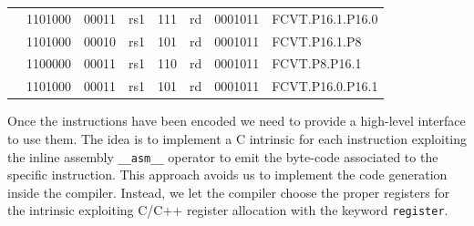 \begin{table}
\begin{small}
\begin{center}
\begin{tabular}{p{0in}p{0.4in}p{0.05in}p{0.05in}p{0.05in}p{0.05in}p{0.4in}p{0.6in}p{0.4in}p{0.6in}p{0.7in}l}
&
\multicolumn{4}{|c|}{1101000} &
\multicolumn{2}{c|}{00011} &
\multicolumn{1}{c|}{rs1} &
\multicolumn{1}{c|}{111} &
\multicolumn{1}{c|}{rd} &
\multicolumn{1}{c|}{0001011} & FCVT.P16.1.P16.0 \\
\cline{2-11}


&
\multicolumn{4}{|c|}{1101000} &
\multicolumn{2}{c|}{00010} &
\multicolumn{1}{c|}{rs1} &
\multicolumn{1}{c|}{101} &
\multicolumn{1}{c|}{rd} &
\multicolumn{1}{c|}{0001011} & FCVT.P16.1.P8 \\
\cline{2-11}


&
\multicolumn{4}{|c|}{1100000} &
\multicolumn{2}{c|}{00011} &
\multicolumn{1}{c|}{rs1} &
\multicolumn{1}{c|}{110} &
\multicolumn{1}{c|}{rd} &
\multicolumn{1}{c|}{0001011} & FCVT.P8.P16.1 \\
\cline{2-11}


&
\multicolumn{4}{|c|}{1101000} &
\multicolumn{2}{c|}{00011} &
\multicolumn{1}{c|}{rs1} &
\multicolumn{1}{c|}{101} &
\multicolumn{1}{c|}{rd} &
\multicolumn{1}{c|}{0001011} & FCVT.P16.0.P16.1 \\
\cline{2-11}


\end{tabular}
\end{center}
\end{small}
\label{tab:rvxposit}
\end{table}


Once the instructions have been encoded we need to provide a high-level interface to use them. The idea is to implement a C intrinsic for each instruction exploiting the inline assembly \texttt{\_\_asm\_\_} operator to emit the byte-code associated to the specific instruction.
This approach avoids us to implement the code generation inside the compiler. Instead, we let the compiler choose the proper registers for the intrinsic exploiting C/C++ register allocation with the keyword \texttt{register}.

